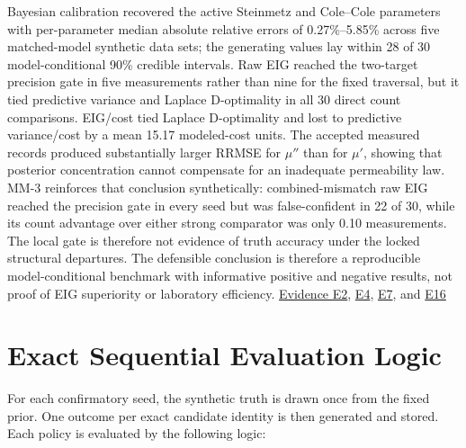 Bayesian calibration recovered the active Steinmetz and Cole--Cole
parameters with per-parameter median absolute relative errors of
0.27\%--5.85\% across five matched-model synthetic data sets; the
generating values lay within 28 of 30 model-conditional 90\% credible
intervals. Raw EIG reached the two-target precision gate in five
measurements rather than nine for the fixed traversal, but it tied
predictive variance and Laplace D-optimality in all 30 direct count
comparisons. EIG/cost tied Laplace D-optimality and lost to predictive
variance/cost by a mean 15.17 modeled-cost units. The accepted measured
records produced substantially larger RRMSE for \(\mu''\) than for
\(\mu'\), showing that posterior concentration cannot compensate for an
inadequate permeability law. MM-3 reinforces that conclusion
synthetically: combined-mismatch raw EIG reached the precision gate in
every seed but was false-confident in 22 of 30, while its count
advantage over either strong comparator was only 0.10 measurements. The
local gate is therefore not evidence of truth accuracy under the locked
structural departures. The defensible conclusion is therefore a
reproducible model-conditional benchmark with informative positive and
negative results, not proof of EIG superiority or laboratory efficiency.
\href{https://github.com/hoangduong6210/EIG-bayesian-for-Recover-potential-Physical-Parameter-of-MagComponent/blob/927bbcb6d0b862598fae87d2575a872bbd79b5f1/wiki/evidence/Evidence-Sources.md\#e2}{Evidence
E2},
\href{https://github.com/hoangduong6210/EIG-bayesian-for-Recover-potential-Physical-Parameter-of-MagComponent/blob/927bbcb6d0b862598fae87d2575a872bbd79b5f1/wiki/evidence/Evidence-Sources.md\#e4}{E4},
\href{https://github.com/hoangduong6210/EIG-bayesian-for-Recover-potential-Physical-Parameter-of-MagComponent/blob/927bbcb6d0b862598fae87d2575a872bbd79b5f1/wiki/evidence/Evidence-Sources.md\#e7}{E7},
and
\href{https://github.com/hoangduong6210/EIG-bayesian-for-Recover-potential-Physical-Parameter-of-MagComponent/blob/927bbcb6d0b862598fae87d2575a872bbd79b5f1/wiki/evidence/Evidence-Sources.md\#e16}{E16}

\hypertarget{exact-sequential-evaluation-logic}{%
\section{Exact Sequential Evaluation
Logic}\label{exact-sequential-evaluation-logic}}

For each confirmatory seed, the synthetic truth is drawn once from the
fixed prior. One outcome per exact candidate identity is then generated
and stored. Each policy is evaluated by the following logic:

